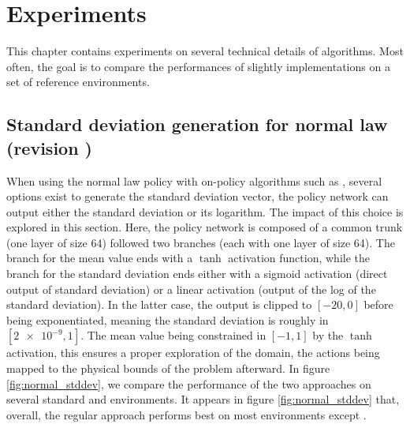 \chapter{Experiments}

This chapter contains experiments on several technical details of algorithms. Most often, the goal is to compare the performances of slightly implementations on a set of reference environments.

\section{Standard deviation generation for normal law (revision )}

When using the normal law policy with on-policy algorithms such as \ppo, several options exist to generate the standard deviation vector, the policy network can output either the standard deviation or its logarithm. The impact of this choice is explored in this section. Here, the policy network is composed of a common trunk (one layer of size 64) followed two branches (each with one layer of size 64). The branch for the mean value ends with a $\tanh$ activation function, while the branch for the standard deviation ends either with a sigmoid activation (direct output of standard deviation) or a linear activation (output of the log of the standard deviation). In the latter case, the output is clipped to $[-20,0]$ before being exponentiated, meaning the standard deviation is roughly in $[\num{2e-9},1]$. The mean value being constrained in $[-1,1]$ by the $\tanh$ activation, this ensures a proper exploration of the domain, the actions being mapped to the physical bounds of the problem afterward. In figure \ref{fig:normal_stddev}, we compare the performance of the two approaches on several standard \gym and \mujoco environments. It appears in figure \ref{fig:normal_stddev} that, overall, the regular approach performs best on most environments except .



